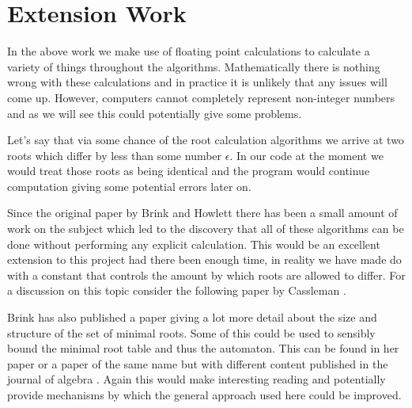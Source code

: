 \documentclass[a4paper,12pt]{article}
\begin{document}
\section{Extension Work}
In the above work we make use of floating point calculations to calculate a variety of things throughout the algorithms. Mathematically there is nothing wrong with these calculations and in practice it is unlikely that any issues will come up. However, computers cannot completely represent non-integer numbers and as we will see this could potentially give some problems.

Let's say that via some chance of the root calculation algorithms we arrive at two roots which differ by less than some number $\epsilon$. In our code at the moment we would treat those roots as being identical and the program would continue computation giving some potential errors later on.

Since the original paper by Brink and Howlett \cite{brinkhowlett93} there has been a small amount of work on the subject which led to the discovery that all of these algorithms can be done without performing any explicit calculation. This would be an excellent extension to this project had there been enough time, in reality we have made do with a constant that controls the amount by which roots are allowed to differ. For a discussion on this topic consider the following paper by Cassleman \cite{casselman08}.

Brink has also published a paper giving a lot more detail about the size and structure of the set of minimal roots. Some of this could be used to sensibly bound the minimal root table and thus the automaton. This can be found in her paper \cite{brinkresearch} or a paper of the same name but with different content published in the journal of algebra \cite{brinkjournal94}. Again this would make interesting reading and potentially provide mechanisms by which the general approach used here could be improved.



\end{document}
